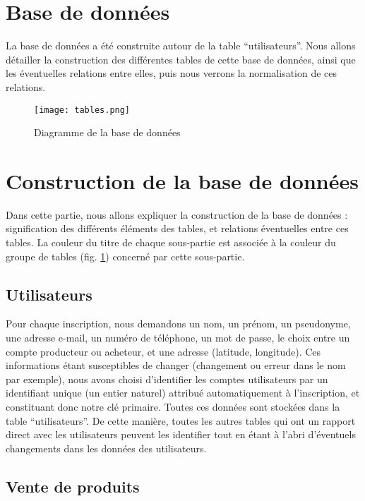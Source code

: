 \documentclass{article}
\begin{document}
\section*{Base de données}

La base de données a été construite autour de la table “utilisateurs”. Nous allons détailler la construction des différentes tables de cette base de données, ainsi que les éventuelles relations entre elles, puis nous verrons la normalisation de ces relations.

\begin{figure}[!h]
\centering
\texttt{[image: tables.png]}
\caption{\label{fig:tables}Diagramme de la base de données}
\end{figure}

\section{Construction de la base de données}

Dans cette partie, nous allons expliquer la construction de la base de données : signification des différents éléments des tables, et relations éventuelles entre ces tables. La couleur du titre de chaque sous-partie est associée à la couleur du groupe de tables (fig. \ref{fig:tables}) concerné par cette sous-partie.

\subsection{\color{cyan}Utilisateurs}

Pour chaque inscription, nous demandons un nom, un prénom, un pseudonyme, une adresse e-mail, un numéro de téléphone, un mot de passe, le choix entre un compte producteur ou acheteur, et une adresse (latitude, longitude). Ces informations étant susceptibles de changer (changement ou erreur dans le nom par exemple), nous avons choisi d’identifier les comptes utilisateurs par un identifiant unique (un entier naturel) attribué automatiquement à l’inscription, et constituant donc notre clé primaire. Toutes ces données sont stockées dans la table “utilisateurs”. De cette manière, toutes les autres tables qui ont un rapport direct avec les utilisateurs peuvent les identifier tout en étant à l’abri d’éventuels changements dans les données des utilisateurs.

\subsection{\color{lime}Vente de produits}
\end{document}
